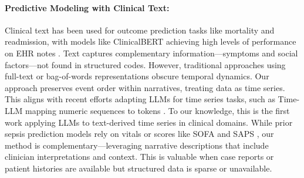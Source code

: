 \paragraph{Predictive Modeling with Clinical Text:}
Clinical text has been used for outcome prediction tasks like mortality and readmission, with models like ClinicalBERT achieving high levels of performance on EHR notes \citep{huang2019clinicalbert, gu2021domain}. 
Text captures complementary information—symptoms and social factors—not found in structured codes. 
However, traditional approaches using full-text or bag-of-words representations obscure temporal dynamics. 
Our approach preserves event order within narratives, treating data as time series. This aligns with recent efforts adapting LLMs for time series tasks, such as Time-LLM mapping numeric sequences to tokens \citep{jin2023time}. 
To our knowledge, this is the first work applying LLMs to text-derived time series in clinical domains. 
While prior sepsis prediction models rely on vitals or scores like SOFA and SAPS \citep{hou2020predicting, noroozizadeh2023temporal}, our method is complementary—leveraging narrative descriptions that include clinician interpretations and context. 
This is valuable when case reports or patient histories are available but structured data is sparse or unavailable.


